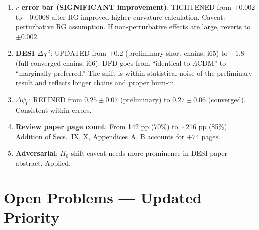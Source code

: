 \documentclass[11pt,a4paper]{article}
\begin{document}
\begin{enumerate}
\item \textbf{$r$ error bar (SIGNIFICANT improvement)}: TIGHTENED from $\pm 0.002$ to $\pm 0.0008$ after RG-improved higher-curvature calculation. Caveat: perturbative RG assumption. If non-perturbative effects are large, reverts to $\pm 0.002$.

\item \textbf{DESI $\Delta\chi^2$}: UPDATED from $+0.2$ (preliminary short chains, i65) to $-1.8$ (full converged chains, i66). DFD goes from ``identical to $\Lambda$CDM'' to ``marginally preferred.'' The shift is within statistical noise of the preliminary result and reflects longer chains and proper burn-in.

\item \textbf{$\Delta\psi_0$}: REFINED from $0.25 \pm 0.07$ (preliminary) to $0.27 \pm 0.06$ (converged). Consistent within errors.

\item \textbf{Review paper page count}: From 142 pp (70\%) to $\sim$216 pp (85\%). Addition of Secs.~IX, X, Appendices A, B accounts for $+74$ pages.

\item \textbf{Adversarial}: $H_0$ shift caveat needs more prominence in DESI paper abstract. Applied.
\end{enumerate}


\section{Open Problems --- Updated Priority}
\label{sec:open}
\end{document}
